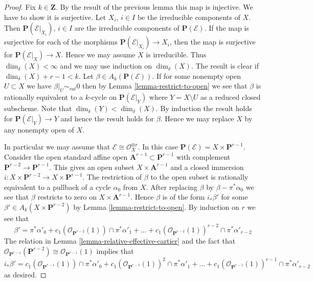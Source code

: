 \begin{proof}
Fix $k \in \mathbf{Z}$.
By the result of the previous lemma this map is injective.
We have to show it is surjective.
Let $X_i$, $i \in I$ be the irreducible components of $X$.
Then $\mathbf{P}(\mathcal{E}|_{X_i})$, $i \in I$
are the irreducible components of $\mathbf{P}(\mathcal{E})$.
If the map is surjective for each of the morphisms
$\mathbf{P}(\mathcal{E}|_{X_i}) \to X_i$, then the map is
surjective for $\mathbf{P}(\mathcal{E}|_X) \to X$.
Hence we may assume $X$ is irreducible.
Thus $\dim_\delta(X) < \infty$ and we may use
induction on $\dim_\delta(X)$.
The result is clear if $\dim_\delta(X) + r - 1 < k$.
Let $\beta \in A_k(\mathbf{P}(\mathcal{E}))$.
If for some nonempty open $U \subset X$ we have $\beta|_U \sim_{rat} 0$
then by Lemma \ref{lemma-restrict-to-open} we see that $\beta$
is rationally equivalent to a $k$-cycle on $\mathbf{P}(\mathcal{E}|_Y)$
where $Y = X \setminus U$ as a reduced closed subscheme.
Note that $\dim_\delta(Y) < \dim_\delta(X)$.
By induction the result holds
for $\mathbf{P}(\mathcal{E}|_Y) \to Y$ and hence the
result holds for $\beta$. Hence we may replace $X$ by any nonempty
open of $X$.

\medskip\noindent
In particular we may assume that $\mathcal{E} \cong \mathcal{O}_X^{\oplus r}$.
In this case $\mathbf{P}(\mathcal{E}) = X \times \mathbf{P}^{r - 1}$.
Consider the open standard affine open
$\mathbf{A}^{r - 1} \subset \mathbf{P}^{r - 1}$ with complement
$\mathbf{P}^{r - 2} \to \mathbf{P}^{r - 1}$.
This gives an open subset $X \times \mathbf{A}^{r - 1}$ and a
closed immersion
$i : X \times \mathbf{P}^{r - 2} \to X \times \mathbf{P}^{r - 1}$.
The restriction of $\beta$ to the open subset is rationally equivalent
to a pullback of a cycle $\alpha_0$ from $X$. After replacing
$\beta$ by $\beta - \pi^*\alpha_0$ we see that $\beta$ restricts
to zero on $X \times \mathbf{A}^{r - 1}$. Hence $\beta$ is
of the form $i_*\beta'$ for some $\beta' \in A_k(X \times \mathbf{P}^{r - 2})$
by Lemma \ref{lemma-restrict-to-open}. By induction on $r$ we see that
$$
\beta' =
\pi^*\alpha'_0 +
c_1(\mathcal{O}_{\mathbf{P}^{r - 2}}(1)) \cap \pi^*\alpha'_1 + \ldots +
c_1(\mathcal{O}_{\mathbf{P}^{r - 2}}(1))^{r - 2} \cap \pi^*\alpha'_{r-2}
$$
The relation in Lemma \ref{lemma-relative-effective-cartier}
and the fact that
$\mathcal{O}_{\mathbf{P}^{r - 1}}(\mathbf{P}^{r - 2})
\cong \mathcal{O}_{\mathbf{P}^{r - 1}}(1)$ implies
that
$$
i_*\beta' =
c_1(\mathcal{O}_{\mathbf{P}^{r - 1}}(1)) \cap \pi^*\alpha'_0 +
c_1(\mathcal{O}_{\mathbf{P}^{r - 1}}(1))^2 \cap \pi^*\alpha'_1 + \ldots +
c_1(\mathcal{O}_{\mathbf{P}^{r - 1}}(1))^{r - 1} \cap \pi^*\alpha'_{r-2}
$$
as desired.
\end{proof}

